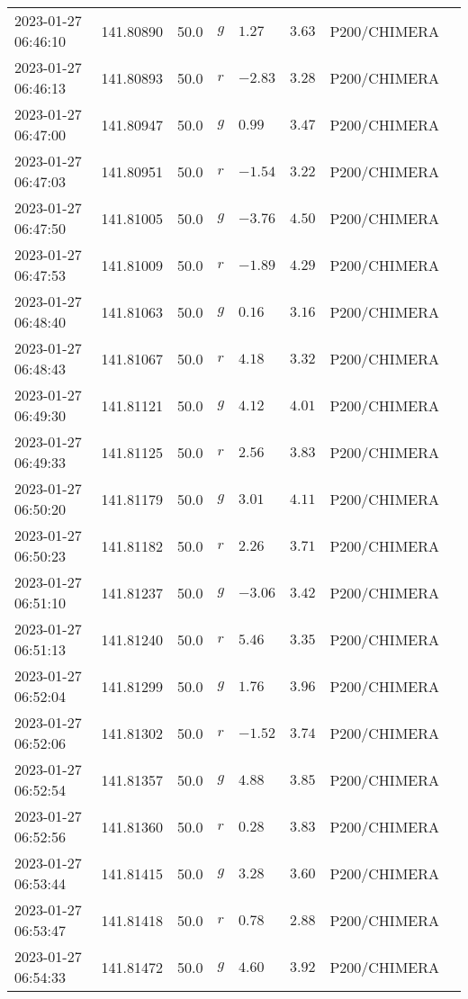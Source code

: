 \documentclass{nature_plusfigure}
\begin{document}
\begin{supplement}
\begin{center}
\begin{longtable}{llllllll}
2023-01-27 06:46:10 & 141.80890 & 50.0 & $g$ & $1.27$ & $3.63$ & P200/CHIMERA &  \\ 
2023-01-27 06:46:13 & 141.80893 & 50.0 & $r$ & $-2.83$ & $3.28$ & P200/CHIMERA &  \\ 
2023-01-27 06:47:00 & 141.80947 & 50.0 & $g$ & $0.99$ & $3.47$ & P200/CHIMERA &  \\ 
2023-01-27 06:47:03 & 141.80951 & 50.0 & $r$ & $-1.54$ & $3.22$ & P200/CHIMERA &  \\ 
2023-01-27 06:47:50 & 141.81005 & 50.0 & $g$ & $-3.76$ & $4.50$ & P200/CHIMERA &  \\ 
2023-01-27 06:47:53 & 141.81009 & 50.0 & $r$ & $-1.89$ & $4.29$ & P200/CHIMERA &  \\ 
2023-01-27 06:48:40 & 141.81063 & 50.0 & $g$ & $0.16$ & $3.16$ & P200/CHIMERA &  \\ 
2023-01-27 06:48:43 & 141.81067 & 50.0 & $r$ & $4.18$ & $3.32$ & P200/CHIMERA &  \\ 
2023-01-27 06:49:30 & 141.81121 & 50.0 & $g$ & $4.12$ & $4.01$ & P200/CHIMERA &  \\ 
2023-01-27 06:49:33 & 141.81125 & 50.0 & $r$ & $2.56$ & $3.83$ & P200/CHIMERA &  \\ 
2023-01-27 06:50:20 & 141.81179 & 50.0 & $g$ & $3.01$ & $4.11$ & P200/CHIMERA &  \\ 
2023-01-27 06:50:23 & 141.81182 & 50.0 & $r$ & $2.26$ & $3.71$ & P200/CHIMERA &  \\ 
2023-01-27 06:51:10 & 141.81237 & 50.0 & $g$ & $-3.06$ & $3.42$ & P200/CHIMERA &  \\ 
2023-01-27 06:51:13 & 141.81240 & 50.0 & $r$ & $5.46$ & $3.35$ & P200/CHIMERA &  \\ 
2023-01-27 06:52:04 & 141.81299 & 50.0 & $g$ & $1.76$ & $3.96$ & P200/CHIMERA &  \\ 
2023-01-27 06:52:06 & 141.81302 & 50.0 & $r$ & $-1.52$ & $3.74$ & P200/CHIMERA &  \\ 
2023-01-27 06:52:54 & 141.81357 & 50.0 & $g$ & $4.88$ & $3.85$ & P200/CHIMERA &  \\ 
2023-01-27 06:52:56 & 141.81360 & 50.0 & $r$ & $0.28$ & $3.83$ & P200/CHIMERA &  \\ 
2023-01-27 06:53:44 & 141.81415 & 50.0 & $g$ & $3.28$ & $3.60$ & P200/CHIMERA &  \\ 
2023-01-27 06:53:47 & 141.81418 & 50.0 & $r$ & $0.78$ & $2.88$ & P200/CHIMERA &  \\ 
2023-01-27 06:54:33 & 141.81472 & 50.0 & $g$ & $4.60$ & $3.92$ & P200/CHIMERA &  \\ 

\end{longtable}
\end{center}
\end{supplement}
\end{document}
